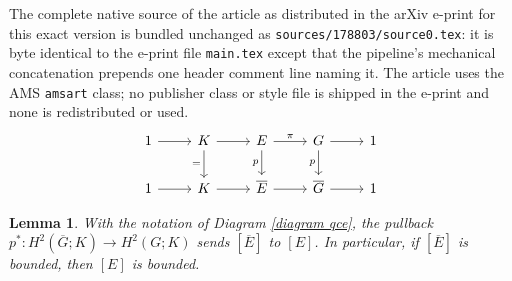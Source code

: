 \documentclass[10pt,a4paper]{amsart}
\newtheorem{lemma}{Lemma}
\begin{document}
The complete native source of the article as distributed in the arXiv e-print for this exact version is bundled unchanged as \texttt{sources/178803/source0.tex}: it is byte identical to the e-print file \texttt{main.tex} except that the pipeline's mechanical concatenation prepends one header comment line naming it. The article uses the AMS \texttt{amsart} class; no publisher class or style file is shipped in the e-print and none is redistributed or used.
\begin{equation}
\label{diagram qce}
\begin{tikzcd}
	1 & K & E & G & 1 \\
	1 & K & {\overline{E}} & {\overline{G}} & 1
	\arrow[from=1-1, to=1-2]
	\arrow[from=1-2, to=1-3]
	\arrow["{=}"', from=1-2, to=2-2]
	\arrow["\pi", from=1-3, to=1-4]
	\arrow["p"', from=1-3, to=2-3]
	\arrow[from=1-4, to=1-5]
	\arrow["p"', from=1-4, to=2-4]
	\arrow[from=2-1, to=2-2]
	\arrow[from=2-2, to=2-3]
	\arrow[from=2-3, to=2-4]
	\arrow[from=2-4, to=2-5]
\end{tikzcd}
\end{equation}

\begin{lemma}
\label{qce pullback}
    With the notation of Diagram \eqref{diagram qce}, the pullback $p^* \colon H^2(\overline{G}; K) \to H^2(G; K)$ sends $[\overline{E}]$ to $[E]$. In particular, if $[\overline{E}]$ is bounded, then $[E]$ is bounded.
\end{lemma}
\end{document}
